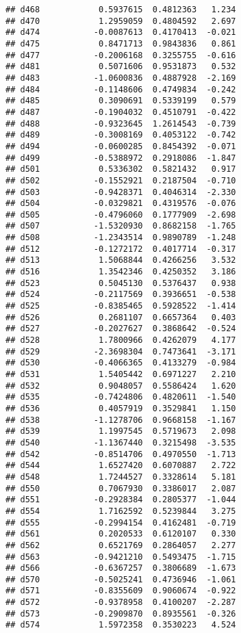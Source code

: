 \documentclass[
]{article}
\begin{document}
\begin{verbatim}
## d468            0.5937615  0.4812363   1.234
## d470            1.2959059  0.4804592   2.697
## d474           -0.0087613  0.4170413  -0.021
## d475            0.8471713  0.9843836   0.861
## d477           -0.2006168  0.3255755  -0.616
## d481            0.5071606  0.9531873   0.532
## d483           -1.0600836  0.4887928  -2.169
## d484           -0.1148606  0.4749834  -0.242
## d485            0.3090691  0.5339199   0.579
## d487           -0.1904032  0.4510791  -0.422
## d488           -0.9323645  1.2614543  -0.739
## d489           -0.3008169  0.4053122  -0.742
## d494           -0.0600285  0.8454392  -0.071
## d499           -0.5388972  0.2918086  -1.847
## d501            0.5336302  0.5821432   0.917
## d502           -0.1552921  0.2187504  -0.710
## d503           -0.9428371  0.4046314  -2.330
## d504           -0.0329821  0.4319576  -0.076
## d505           -0.4796060  0.1777909  -2.698
## d507           -1.5320930  0.8682158  -1.765
## d508           -1.2343514  0.9890789  -1.248
## d512           -0.1272172  0.4017714  -0.317
## d513            1.5068844  0.4266256   3.532
## d516            1.3542346  0.4250352   3.186
## d523            0.5045130  0.5376437   0.938
## d524           -0.2117569  0.3936651  -0.538
## d525           -0.8385465  0.5928522  -1.414
## d526            0.2681107  0.6657364   0.403
## d527           -0.2027627  0.3868642  -0.524
## d528            1.7800966  0.4262079   4.177
## d529           -2.3698304  0.7473641  -3.171
## d530           -0.4066365  0.4133279  -0.984
## d531            1.5405442  0.6971227   2.210
## d532            0.9048057  0.5586424   1.620
## d535           -0.7424806  0.4820611  -1.540
## d536            0.4057919  0.3529841   1.150
## d538           -1.1278706  0.9668158  -1.167
## d539            1.1997545  0.5719673   2.098
## d540           -1.1367440  0.3215498  -3.535
## d542           -0.8514706  0.4970550  -1.713
## d544            1.6527420  0.6070887   2.722
## d548            1.7244527  0.3328614   5.181
## d550            0.7067930  0.3386017   2.087
## d551           -0.2928384  0.2805377  -1.044
## d554            1.7162592  0.5239844   3.275
## d555           -0.2994154  0.4162481  -0.719
## d561            0.2020533  0.6120107   0.330
## d562            0.6521769  0.2864057   2.277
## d563           -0.9421210  0.5493475  -1.715
## d566           -0.6367257  0.3806689  -1.673
## d570           -0.5025241  0.4736946  -1.061
## d571           -0.8355609  0.9060674  -0.922
## d572           -0.9378958  0.4100207  -2.287
## d573           -0.2909870  0.8935561  -0.326
## d574            1.5972358  0.3530223   4.524

\end{verbatim}
\end{document}
